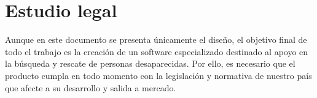     

    
    
       
    \section{Estudio legal}\label{legal}

    Aunque en este documento se presenta únicamente el diseño, el objetivo final de todo el trabajo es la creación de un software especializado destinado al apoyo en la búsqueda y rescate de personas desaparecidas. Por ello, es necesario que el producto cumpla en todo momento con la legislación y normativa de nuestro país que afecte a su desarrollo y salida a mercado.
    
